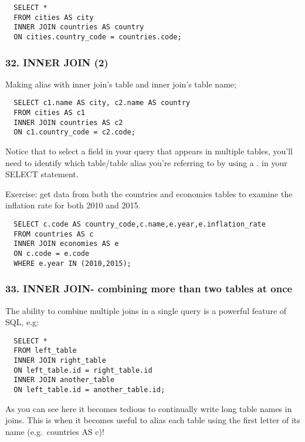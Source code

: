 \documentclass[
]{article}
\begin{document}
\begin{verbatim}
  SELECT *
  FROM cities AS city
  INNER JOIN countries AS country
  ON cities.country_code = countries.code;
\end{verbatim}

\hypertarget{inner-join-2}{%
\subsubsection{32. INNER JOIN (2)}\label{inner-join-2}}

Making alias with inner join's table and inner join's table name;

\begin{verbatim}
  SELECT c1.name AS city, c2.name AS country
  FROM cities AS c1
  INNER JOIN countries AS c2
  ON c1.country_code = c2.code;
\end{verbatim}

Notice that to select a field in your query that appears in multiple
tables, you'll need to identify which table/table alias you're referring
to by using a . in your SELECT statement.

Exercise: get data from both the countries and economies tables to
examine the inflation rate for both 2010 and 2015.

\begin{verbatim}
  SELECT c.code AS country_code,c.name,e.year,e.inflation_rate
  FROM countries AS c
  INNER JOIN economies AS e
  ON c.code = e.code
  WHERE e.year IN (2010,2015);
\end{verbatim}

\hypertarget{inner-join--combining-more-than-two-tables-at-once}{%
\subsubsection{33. INNER JOIN- combining more than two tables at
once}\label{inner-join--combining-more-than-two-tables-at-once}}

The ability to combine multiple joins in a single query is a powerful
feature of SQL, e.g:

\begin{verbatim}
  SELECT *
  FROM left_table
  INNER JOIN right_table
  ON left_table.id = right_table.id
  INNER JOIN another_table
  ON left_table.id = another_table.id;
\end{verbatim}

As you can see here it becomes tedious to continually write long table
names in joins. This is when it becomes useful to alias each table using
the first letter of its name (e.g.~countries AS c)!
\end{document}
